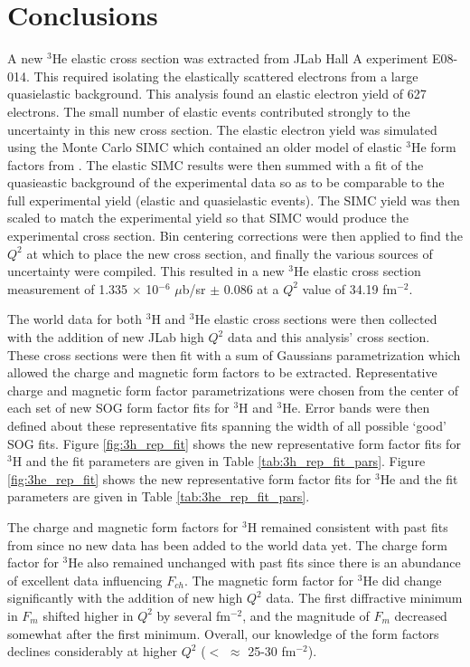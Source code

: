\chapter{Conclusions} %
\label{ch:conclusions} %

A new $^3$He elastic cross section was extracted from JLab Hall A experiment E08-014. This required isolating the elastically scattered electrons from a large quasielastic background. This analysis found an elastic electron yield of 627 electrons. The small number of elastic events contributed strongly to the uncertainty in this new cross section. The elastic electron yield was simulated using the Monte Carlo SIMC which contained an older model of elastic $^3$He form factors from \cite{Article:Amroun}. The elastic SIMC results were then summed with a fit of the quasieastic background of the experimental data so as to be comparable to the full experimental yield (elastic and quasielastic events). The SIMC yield was then scaled to match the experimental yield so that SIMC would produce the experimental cross section. Bin centering corrections were then applied to find the $Q^2$ at which to place the new cross section, and finally the various sources of uncertainty were compiled. This resulted in a new $^3$He elastic cross section measurement of 1.335 $\times$ 10$^{-6}$ $\mu$b/sr $\pm$ 0.086 at a $Q^2$ value of 34.19 fm$^{-2}$. 

The world data for both $^3$H and $^3$He elastic cross sections were then collected with the addition of new JLab high $Q^2$ data and this analysis' cross section. These cross sections were then fit with a sum of Gaussians parametrization which allowed the charge and magnetic form factors to be extracted. Representative charge and magnetic form factor parametrizations were chosen from the center of each set of new SOG form factor fits for $^3$H and $^3$He. Error bands were then defined about these representative fits spanning the width of all possible `good' SOG fits. Figure \ref{fig:3h_rep_fit} shows the new representative form factor fits for $^3$H and the fit parameters are given in Table \ref{tab:3h_rep_fit_pars}. Figure \ref{fig:3he_rep_fit} shows the new representative form factor fits for $^3$He and the fit parameters are given in Table \ref{tab:3he_rep_fit_pars}.

The charge and magnetic form factors for $^3$H remained consistent with past fits from \cite{Article:Amroun} since no new data has been added to the world data yet. The charge form factor for $^3$He also remained unchanged with past fits since there is an abundance of excellent data influencing $F_{ch}$. The magnetic form factor for $^3$He did change significantly with the addition of new high $Q^2$ data. The first diffractive minimum in $F_m$ shifted higher in $Q^2$ by several fm$^{-2}$, and the magnitude of $F_m$ decreased somewhat after the first minimum. Overall, our knowledge of the form factors declines considerably at higher $Q^2$ ($<$ $\approx$ 25-30 fm$^{-2}$). 

